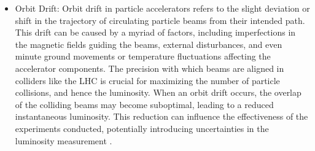 \begin{itemize}

\item Orbit Drift: Orbit drift in particle accelerators refers to the slight deviation or shift in the trajectory of circulating particle beams from their intended path. This drift can be caused by a myriad of factors, including imperfections in the magnetic fields guiding the beams, external disturbances, and even minute ground movements or temperature fluctuations affecting the accelerator components. The precision with which beams are aligned in colliders like the LHC is crucial for maximizing the number of particle collisions, and hence the luminosity. When an orbit drift occurs, the overlap of the colliding beams may become suboptimal, leading to a reduced instantaneous luminosity. This reduction can influence the effectiveness of the experiments conducted, potentially introducing uncertainties in the luminosity measurement \cite{CERNOribLumi}.

\end{itemize}
